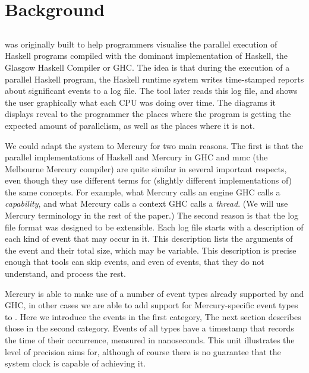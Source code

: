 \section{Background}
\label{sec:background}

\subsection{\tscope}

\tscope was originally built
to help programmers visualise the parallel execution of Haskell programs
compiled with the dominant implementation of Haskell,
the Glasgow Haskell Compiler or GHC.
The idea is that during the execution of a parallel Haskell program,
the Haskell runtime system writes time-stamped reports
about significant events to a log file.
The \tscope tool later reads this log file,
and shows the user graphically what each CPU was doing over time.
The diagrams it displays reveal to the programmer
the places where the program is getting the expected amount of parallelism,
as well as the places where it is not.

We could adapt the \tscope system to Mercury for two main reasons.
The first is that the parallel implementations of Haskell and Mercury
in GHC and mmc (the Melbourne Mercury compiler)
are quite similar in several important respects,
even though they use different terms for
(slightly different implementations of) the same concepts.
For example, what Mercury calls an engine GHC calls a \emph{capability},
and what Mercury calls a context GHC calls a \emph{thread}.
(We will use Mercury terminology in the rest of the paper.)
The second reason is that
the \tscope log file format was designed to be extensible.
Each log file starts with a description
of each kind of event that may occur in it.
This description lists the arguments of the event and their total size,
which may be variable.
This description is precise enough that tools 
can skip events, and even of events, that they do not understand,
and process the rest.

Mercury is able to make use of a number of event types already supported by
\tscope and GHC,
in other cases we are able to add support for Mercury-specific event types to
\tscope.
Here we introduce the events in the first category,
The next section describes those in the second category.
Events of all types have a timestamp
that records the time of their occurrence, measured in nanoseconds.
This unit illustrates the level of precision \tscope aims for,
although of course there is no guarantee
that the system clock is capable of achieving it.

